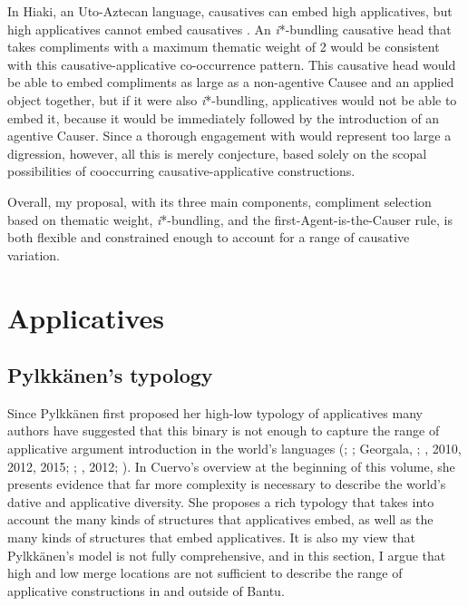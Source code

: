 \documentclass[output=paper]{langscibook}
\begin{document}
In Hiaki, an Uto-Aztecan language, causatives can embed high applicatives, but high applicatives cannot embed causatives \citep{Jung2014}. An \textit{i}*-bundling causative head that takes compliments with a maximum thematic weight of 2 would be consistent with this causative-applicative co-occurrence pattern. This causative head would be able to embed compliments as large as a non-agentive Causee and an applied object together, but if it were also \textit{i}*-bundling, applicatives would not be able to embed it, because it would be immediately followed by the introduction of an agentive Causer. Since a thorough engagement with \citet{Jung2014} would represent too large a digression, however, all this is merely conjecture, based solely on the scopal possibilities of cooccurring causative-applicative constructions. 


Overall, my proposal, with its three main components, compliment selection based on thematic weight, \textit{i}*-bundling, and the first-Agent-is-the-Causer rule, is both flexible and constrained enough to account for a range of causative variation. 

\section{Applicatives}\label{sec:wechsler:3}

\subsection{Pylkkänen’s typology}\label{sec:wechsler:3.1}

Since Pylkkänen first proposed her high-low typology of applicatives  many authors have suggested that this binary is not enough to capture the range of applicative argument introduction in the world’s languages (\citealt{Jeong2007}; \citealt{Peterson2007}; Georgala, \citealt{PaulWhitman2008}; \citealt{Cuervo2003}, 2010, 2012, 2015; \citealt{Tsai2009}; \citealt{Kim2011}, 2012; \citealt{Georgala2012}). In Cuervo’s overview at the beginning of this volume, she presents evidence that far more complexity is necessary to describe the world’s dative and applicative diversity. She proposes a rich typology that takes into account the many kinds of structures that applicatives embed, as well as the many kinds of structures that embed applicatives. It is also my view that Pylkkänen’s model is not fully comprehensive, and in this section, I argue that high and low merge locations are not sufficient to describe the range of applicative constructions in and outside of Bantu. 
\end{document}
